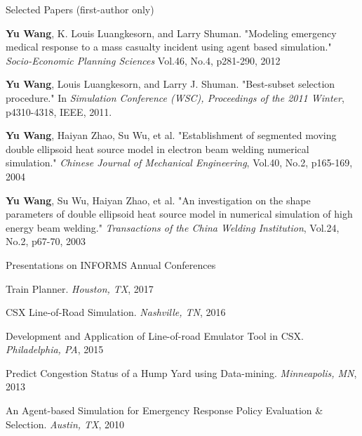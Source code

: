 

\begin{cventries}

\cventry
{Selected Papers (first-author only)}      %
{}                            %
{}                                         %
{}                                         %
{
\begin{cvitems} %
    \item {
\textbf{Yu Wang}, K. Louis Luangkesorn, and Larry Shuman. "Modeling emergency medical response to a mass casualty incident using agent based simulation." \textit{Socio-Economic Planning Sciences} Vol.46, No.4, p281-290, 2012
	}
    \item {
\textbf{Yu Wang}, Louis Luangkesorn, and Larry J. Shuman. "Best-subset selection procedure." In 
\textit{Simulation Conference (WSC), Proceedings of the 2011 Winter}, p4310-4318, IEEE, 2011.
	}
	\item {
\textbf{Yu Wang}, Haiyan Zhao, Su Wu, et al. "Establishment of segmented moving double ellipsoid heat source model in electron beam welding numerical simulation." 
\textit{Chinese Journal of Mechanical Engineering}, Vol.40, No.2, p165-169, 2004
	}
    \item {
\textbf{Yu Wang}, Su Wu, Haiyan Zhao, et al. "An investigation on the shape parameters of double ellipsoid heat source model in numerical simulation of high energy beam welding." 
\textit{Transactions of the China Welding Institution}, Vol.24, No.2, p67-70, 2003
	}	
\end{cvitems}
}

\cventry
{Presentations on INFORMS Annual Conferences}      %
{}                            %
{}                                         %
{}                                         %
{
\begin{cvitems} %
    \item {
Train Planner. \textit{Houston, TX}, 2017
	}
    \item {
CSX Line-of-Road Simulation. \textit{Nashville, TN}, 2016
	}
    \item {
Development and Application of Line-of-road Emulator Tool in CSX. \textit{Philadelphia, PA}, 2015
	}
	\item {
Predict Congestion Status of a Hump Yard using Data-mining. \textit{Minneapolis, MN}, 2013
	}
    \item {
An Agent-based Simulation for Emergency Response Policy Evaluation \& Selection. \textit{Austin, TX}, 2010
	}	
\end{cvitems}
}

\end{cventries}
